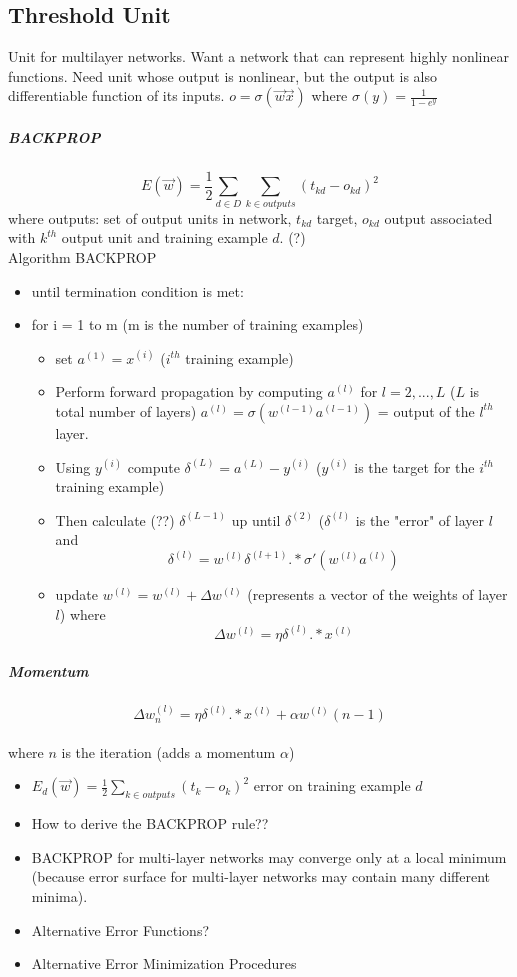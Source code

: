 \documentclass[11pt]{article}
\begin{document}
\subsection{Threshold Unit}
Unit for multilayer networks. Want a network that can represent highly nonlinear functions. Need unit whose output is nonlinear, but the output is also differentiable function of its inputs. $o = \sigma (\vec{w} \vec{x})$ where $\sigma(y) = \frac{1}{1-e^y}$
\subparagraph{\textsc{BACKPROP}}
$$E(\vec{w}) = \frac12 \sum_{d\in D} \sum_{k \in outputs}{(t_{kd} - o_{kd})^2}$$ where outputs: set of output units in network, $t_{kd}$ target, $o_{kd}$ output associated with $k^{th}$ output unit and training example $d$. (?)\\
{\color{red}Algorithm BACKPROP}
\begin{itemize}
\item until termination condition is met:
\item for i = 1 to m (m is the number of training examples)
\begin{itemize}
\item set $a^{(1)} = x^{(i)}$ ($i^{th}$ training example)
\item Perform forward propagation by computing $a^{(l)}$ for $l = 2,...,L$ ($L$ is total number of layers) $a^{(l)}= \sigma (w^{(l-1)}a^{(l-1)}) $ = output of the $l^{th}$ layer. 
\item Using $y^{(i)}$ compute $\delta^{(L)} = a^{(L)} - y^{(i)}$ ($y^{(i)}$ is the target for the $i^{th}$ training example)
\item Then calculate (??) $\delta^{(L-1)}$ up until $\delta^{(2)}$ ($\delta^{(l)}$ is the "error" of layer $l$ and $$\delta^{(l)} = w^{(l)}\delta^{(l+1)} .* \sigma'(w^{(l)} a^{(l)})$$
\item update $w^{(l)} = w^{(l)} + \Delta w^{(l)}$ (represents a vector of the weights of layer $l$) where  $$\Delta w^{(l)} = \eta \delta^{(l)}.*x^{(l)}$$
\end{itemize}
\end{itemize}

\subparagraph{Momentum}
$$\Delta w^{(l)}_n= \eta \delta^{(l)}.*x^{(l)} +\alpha w^{(l)} (n-1) $$\\ where $n$ is the iteration (adds a momentum $\alpha$)
\begin{itemize}
\item $E_d(\vec{w}) = \frac12 \sum_{k\in outputs}{(t_k - o_k)^2}$ error on training example $d$
\item How to derive the \textsc{BACKPROP} rule??
\item \textsc{BACKPROP} for multi-layer networks may converge only at a local minimum (because error surface for multi-layer networks may contain many different minima).
\item Alternative Error Functions?
\item Alternative Error Minimization Procedures
\end{itemize}
\end{document}
